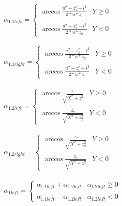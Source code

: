 \documentclass{article}
\begin{document}
    \paragraph{}
    \begin{center}
    $\alpha_{1.1left} = \left\{
    \begin{array}{ll}
    \arccos \frac{u^2 + z_1^2 - l^2}{2 * u * z_1} & Y \ge 0 \\ \\
    \arccos \frac{u^2 + z_2^2 - l^2}{2 * u * z_2} & Y < 0 
    \end{array}
    \right. $ 

    \paragraph{}
    $\alpha_{1.1right} = \left\{
    \begin{array}{ll}
    \arccos \frac{u^2 + z_2^2 - l^2}{2 * u * z_2} & Y \ge 0 \\ \\
    \arccos \frac{u^2 + z_1^2 - l^2}{2 * u * z_1} & Y < 0
    \end{array}
    \right. $ 

    \paragraph{}
    $\alpha_{1.2left} = \left\{
    \begin{array}{ll}
    \arccos \frac{z_1}{\sqrt{X^2 + z_1^2}} & Y \ge 0 \\ \\
    \arccos \frac{z_2}{\sqrt{X^2 + z_2^2}} & Y < 0
    \end{array}
    \right. $ 

    \paragraph{}
    $\alpha_{1.2right} = \left\{
    \begin{array}{ll}
    \arccos \frac{z_2}{\sqrt{X^2 + z_2^2}} & Y \ge 0 \\ \\
    \arccos \frac{z_1}{\sqrt{X^2 + z_1^2}} & Y < 0
    \end{array}
    \right. $ 

    \paragraph{}
    $\alpha_{1left} = \left\{
    \begin{array}{ll}
    \alpha_{1.1left} + \alpha_{1.2left} & \alpha_{1.2left} \ge 0 \\ \\
    \alpha_{1.1left} - \alpha_{1.2left} & \alpha_{1.2left} < 0
    \end{array}
    \right. $    


\end{center}
\end{document}
